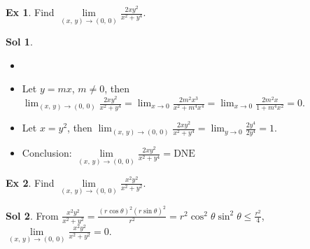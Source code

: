 \documentclass[12pt]{extarticle}
\newcommand{\ds}{\displaystyle}
\theoremstyle{definition}
\newtheorem*{ex}{Ex}
\newtheorem*{sol}{Sol}
\begin{document}
\begin{ex}
  Find $\ds\lim\limits_{(x,\,y)\to (0,\,0)}\frac{2xy^2}{x^2+y^4}$. 
\end{ex}
\begin{sol}
  \begin{itemize}\setlength{\itemsep}{0pt}
    \item[]
    \item Let $y = mx$, $m\ne 0$, then $\ds\lim_{(x,\,y)\to (0,\,0)}\frac{2xy^2}{x^2+y^4} = \lim_{x\to 0}\frac{2m^2x^3}{x^2 + m^4 x^4} = \lim_{x\to 0}\frac{2m^2x}{1 + m^4 x^2} = 0$. 
    \item Let $x = y^2$, then $\ds\lim_{(x,\,y)\to (0,\,0)}\frac{2xy^2}{x^2+y^4} = \lim_{y\to 0}\frac{2y^4}{2y^4} = 1$. 
    \item Conclusion: $\ds\lim\limits_{(x,\,y)\to(0,\,0)}\frac{2xy^2}{x^2+y^4} = \text{DNE}$
  \end{itemize}
\end{sol}

\begin{ex}
  Find $\ds\lim\limits_{(x,\,y)\to (0,\,0)}\frac{x^2y^2}{x^2 + y^2}$. 
\end{ex}
\begin{sol}
  From $\ds\frac{x^2y^2}{x^2 + y^2} = \frac{(r\cos\theta)^2(r\sin\theta)^2}{r^2} = r^2\cos^2\theta\sin^2\theta\leqslant\frac{r^2}{4}$, $\ds\lim\limits_{(x,\,y)\to (0,\,0)}\frac{x^2y^2}{x^2 + y^2} = 0$. 
\end{sol}
\end{document}
